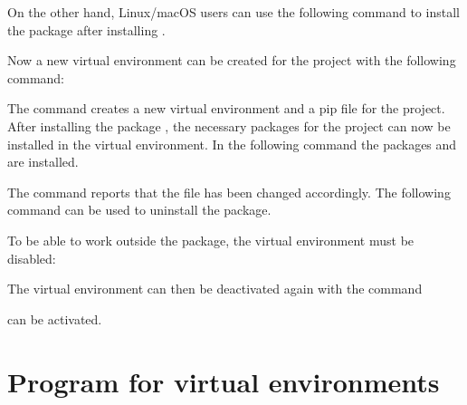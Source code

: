 \medskip


\medskip

On the other hand, Linux/macOS users can use the following command to install the  package after installing .

\medskip


\medskip


Now a new virtual environment can be created for the project with the following command:

\medskip


\medskip

The command creates a new virtual environment  and a pip file  for the project. After installing the package , the necessary packages for the project can now be installed in the virtual environment. In the following command the packages  and  are installed.


\medskip



\medskip

The command reports that the file  has been changed accordingly. The following command can be used to uninstall the package.

\medskip


\medskip

To be able to work outside the package, the virtual environment must be disabled:

\medskip


\medskip


The virtual environment can then be deactivated again with the command 

\medskip



\medskip

can be activated.





\section{Program  for virtual environments}

